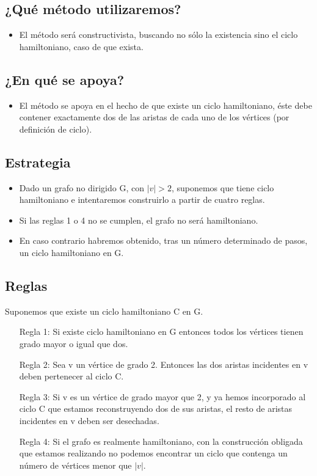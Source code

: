\documentclass[journal]{IEEEtran}
\begin{document}
\subsection{¿Qué m{\'e}todo utilizaremos?}
\begin{itemize}
	\item El m{\'e}todo será constructivista, buscando no s{\'o}lo la existencia sino el ciclo hamiltoniano, caso de que exista.
\end{itemize}

\subsection{¿En qu{\'e} se apoya?}
\begin{itemize}
	\item El m{\'e}todo se apoya en el hecho de que existe un ciclo hamiltoniano, éste debe contener exactamente dos de las aristas de cada uno de los v{\'e}rtices (por definición de ciclo).
\end{itemize}

\subsection{Estrategia}
\begin{itemize}
	\item	Dado un grafo no dirigido G, con $|v|>2$, suponemos que tiene ciclo hamiltoniano e intentaremos construirlo a partir de cuatro reglas.
	\item	Si las reglas 1 o 4 no se cumplen, el grafo no ser{\'a} hamiltoniano.
	\item En caso contrario habremos obtenido, tras un n{\'u}mero determinado de pasos, un ciclo hamiltoniano en G.
\end{itemize}

\subsection{Reglas}
	Suponemos que existe un ciclo hamiltoniano C en G.
\begin{enumerate}
	\item[Regla 1:]  Si existe ciclo hamiltoniano en G entonces todos los v{\'e}rtices tienen grado mayor o igual que dos.
	\item[Regla 2:] Sea v un v{\'e}rtice de grado 2. Entonces las dos aristas incidentes en v deben pertenecer al ciclo C.
	\item[Regla 3:] Si v es un vértice de grado mayor que 2, y ya hemos incorporado al ciclo C que estamos reconstruyendo dos de sus aristas, el resto de aristas incidentes en v deben ser desechadas.
	\item[Regla 4:] Si el grafo es realmente hamiltoniano, con la construcci{\'o}n obligada que estamos realizando no podemos encontrar un ciclo que contenga un número de vértices menor que $|v|$.
\end{enumerate}
\end{document}
